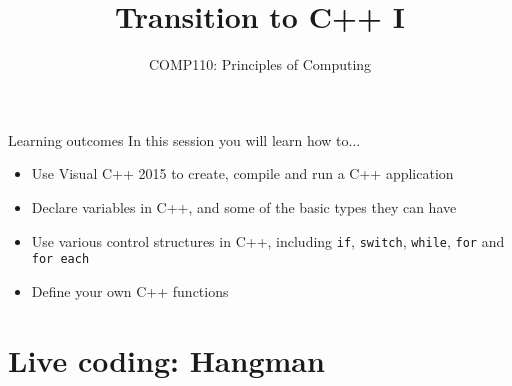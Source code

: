 \documentclass[xcolor={dvipsnames}]{beamer}\usepackage{etoolbox}\newtoggle{printable}\togglefalse{printable}
\begin{document}
\title{Transition to C++ I}   
\subtitle{COMP110: Principles of Computing}

\frame{\titlepage} 

\begin{frame}{Learning outcomes}
	In this session you will learn how to...
	\begin{itemize}
		\item Use Visual C++ 2015 to create, compile and run a C++ application
		\item Declare variables in C++, and some of the basic types they can have
		\item Use various control structures in C++, including \lstinline{if}, \lstinline{switch},
			\lstinline{while}, \lstinline{for} and \lstinline{for each}
		\item Define your own C++ functions
	\end{itemize}
\end{frame}







%

\part{Live coding: Hangman}
\frame{\partpage}


%
\end{document}
